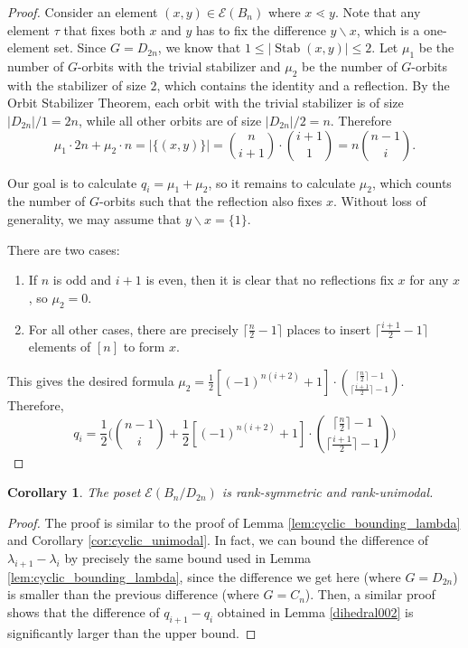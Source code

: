 \documentclass[10 pt]{amsart}
\theoremstyle{plain}
\newtheorem{cor}[thm]{Corollary}
\theoremstyle{definition}
\theoremstyle{remark}
\numberwithin{equation}{section}
\def\Stab{\operatorname{Stab}}
\begin{document}
\begin{proof}
Consider an element $(x , y) \in \mathcal E(B_n)$ where $x \lessdot y$. Note that any element $\tau $ that fixes both $x$ and $y$ has to fix the difference $y\backslash x$, which is a one-element set. Since $G = D_{2n}$, 
we know that $1\leq |\Stab (x , y)| \leq 2$.   
Let $\mu_1$ be the number of $G$-orbits with the trivial stabilizer and $\mu_2$ be the number of $G$-orbits with the stabilizer of size $2$, which contains the identity and a reflection. By the Orbit Stabilizer Theorem, each orbit with the trivial stabilizer is of size $|D_{2n}| /1 = 2n $, while all other orbits are of size $|D_{2n}|/2 = n$.  Therefore $$\mu_1 \cdot 2n + \mu_2 \cdot n = |\{(x, y)\}| = {n \choose {i+1}}  \cdot {{i+1} \choose 1} = n {n-1 \choose i }.$$

Our goal is to calculate $q_i = \mu_1 + \mu_2$, so it remains to calculate $\mu_2$, which counts the number of $G$-orbits such that the reflection also fixes $x$. Without loss of generality, we may assume that $y\backslash x = \{1\}$. 

There are two cases:
\begin{enumerate}
\item If $n$ is odd and $i+1$ is even, then it is clear that no reflections fix $x$ for any $x$, so $\mu_2=0$. 
\item For all other cases, there are precisely $\lceil \frac n 2 -1\rceil$ places to insert $\lceil \frac {i+1} 2 - 1 \rceil$ elements of $[n]$ to form $x$. 
\end{enumerate}
This gives the desired formula $\displaystyle \mu_2 =  \frac{1}{2} [(-1)^{n(i+2)}+1] \cdot { \lceil \frac n 2\rceil -1  \choose \lceil \frac{i+1} 2 \rceil - 1}   $. Therefore, 
$$q_i = \frac{1}{2} \Big( {n-1 \choose i } + \frac{1}{2} [(-1)^{n(i+2)}+1] \cdot { \lceil \frac n 2\rceil -1  \choose \lceil \frac{i+1} 2 \rceil - 1}    \Big)$$
\end{proof}


\begin{cor}{\label{dihedral003}} 
The poset $\mathcal E(B_n/D_{2n})$ is rank-symmetric and rank-unimodal.
\end{cor}

\begin{proof}
The proof is similar to the proof of Lemma \ref{lem:cyclic_bounding_lambda} and Corollary \ref{cor:cyclic_unimodal}. In fact, we can bound the difference of $\lambda_{i+1} - \lambda_i$ by precisely the same bound used in Lemma \ref{lem:cyclic_bounding_lambda}, since the difference we get here (where $G = D_{2n}$) is smaller than the previous difference (where $G= C_n$). Then, a similar proof shows that the difference of $q_{i+1} - q_i$ obtained in Lemma \ref{dihedral002} is significantly larger than the upper bound.
\end{proof}
\end{document}
